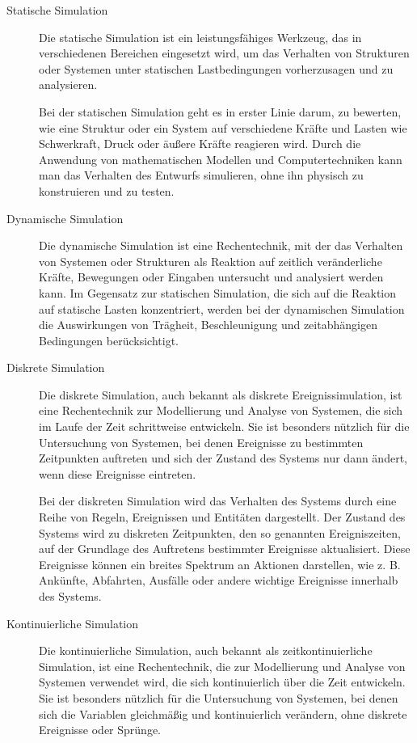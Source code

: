 \begin{description}
    \item[Statische Simulation]
    Die statische Simulation ist ein leistungsfähiges Werkzeug, das in verschiedenen Bereichen eingesetzt wird, um das Verhalten von Strukturen oder Systemen unter statischen Lastbedingungen vorherzusagen und zu analysieren.
    
    Bei der statischen Simulation geht es in erster Linie darum, zu bewerten, wie eine Struktur oder ein System auf verschiedene Kräfte und Lasten wie Schwerkraft, Druck oder äußere Kräfte reagieren wird. Durch die Anwendung von mathematischen Modellen und Computertechniken kann man das Verhalten des Entwurfs simulieren, ohne ihn physisch zu konstruieren und zu testen.
    \cite[vgl.][]{statischeSim}

    \item[Dynamische Simulation]
    Die dynamische Simulation ist eine Rechentechnik, mit der das Verhalten von Systemen oder Strukturen als Reaktion auf zeitlich veränderliche Kräfte, Bewegungen oder Eingaben untersucht und analysiert werden kann. Im Gegensatz zur statischen Simulation, die sich auf die Reaktion auf statische Lasten konzentriert, werden bei der dynamischen Simulation die Auswirkungen von Trägheit, Beschleunigung und zeitabhängigen Bedingungen berücksichtigt.
    \cite[vgl.][]{dynamischeSim}
    
    \item[Diskrete Simulation] 
    Die diskrete Simulation, auch bekannt als diskrete Ereignissimulation, ist eine Rechentechnik zur Modellierung und Analyse von Systemen, die sich im Laufe der Zeit schrittweise entwickeln. Sie ist besonders nützlich für die Untersuchung von Systemen, bei denen Ereignisse zu bestimmten Zeitpunkten auftreten und sich der Zustand des Systems nur dann ändert, wenn diese Ereignisse eintreten.

    Bei der diskreten Simulation wird das Verhalten des Systems durch eine Reihe von Regeln, Ereignissen und Entitäten dargestellt. Der Zustand des Systems wird zu diskreten Zeitpunkten, den so genannten Ereigniszeiten, auf der Grundlage des Auftretens bestimmter Ereignisse aktualisiert. Diese Ereignisse können ein breites Spektrum an Aktionen darstellen, wie z. B. Ankünfte, Abfahrten, Ausfälle oder andere wichtige Ereignisse innerhalb des Systems.
    \cite[vgl.][]{mattern-diskrete-simulation}

    \item[Kontinuierliche Simulation] 
    Die kontinuierliche Simulation, auch bekannt als zeitkontinuierliche Simulation, ist eine Rechentechnik, die zur Modellierung und Analyse von Systemen verwendet wird, die sich kontinuierlich über die Zeit entwickeln. Sie ist besonders nützlich für die Untersuchung von Systemen, bei denen sich die Variablen gleichmäßig und kontinuierlich verändern, ohne diskrete Ereignisse oder Sprünge.


\end{description}

